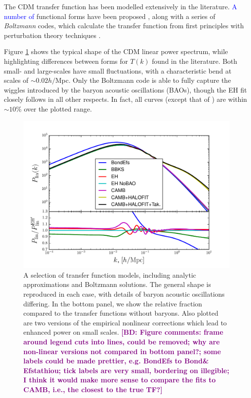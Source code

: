 \documentclass[5p]{elsarticle}
\newcommand{\bd}[1]{\textcolor{purple}{\textbf{[BD: #1]}}}
\newcommand{\bde}[1]{\textcolor{blue}{#1}}
\begin{document}
The CDM transfer function has been modelled extensively in the literature. 
\bde{A number of } functional forms have been proposed \citep[][hereafter EH]{Bond1984,Bardeen1986,Eisenstein1999}, along with a series of \textit{Boltzmann} codes, which calculate the transfer function from first principles with perturbation theory techniques \citep{Zaldarriaga2000,Lewis2000,Blas2011}. 

Figure \ref{fig:power} shows the typical shape of the CDM linear power spectrum, while highlighting differences between forms for $T(k)$ found in the literature. Both small- and large-scales have small fluctuations, with a characteristic bend at scales of $\sim 0.02h/$Mpc. Only the Boltzmann code is able to fully capture the wiggles introduced by the baryon acoustic oscillations (BAOs), though the EH fit closely follows in all other respects. In fact, all curves (except that of \citet{Bond1984}) are within $\sim 10\%$ over the plotted range.

\begin{figure}
  \centering
  \includegraphics[width=\linewidth]{figures/power_fits.pdf}
  \caption[Comparison of transfer function models]{A selection of transfer function models, including analytic approximations \citep{Bond1984,Bardeen1986,Eisenstein1998} and Boltzmann solutions. The general shape is reproduced in each case, with details of baryon acoustic oscillations differing. In the bottom panel, we show the relative fraction compared to the \citet{Eisenstein1999} transfer functions without baryons. Also plotted are two versions of the empirical nonlinear corrections which lead to enhanced power on small scales. \bd{Figure comments: frame around legend cuts into lines, could be removed; why are non-linear versions not compared in bottom panel?; some labels could be made prettier, e.g. BondEfs to Bond\& Efstathiou; tick labels are very small, bordering on illegible; I think it would make more sense to compare the fits to CAMB, i.e., the closest to the true TF?}}
  \label{fig:power}
\end{figure}
  
\end{document}
